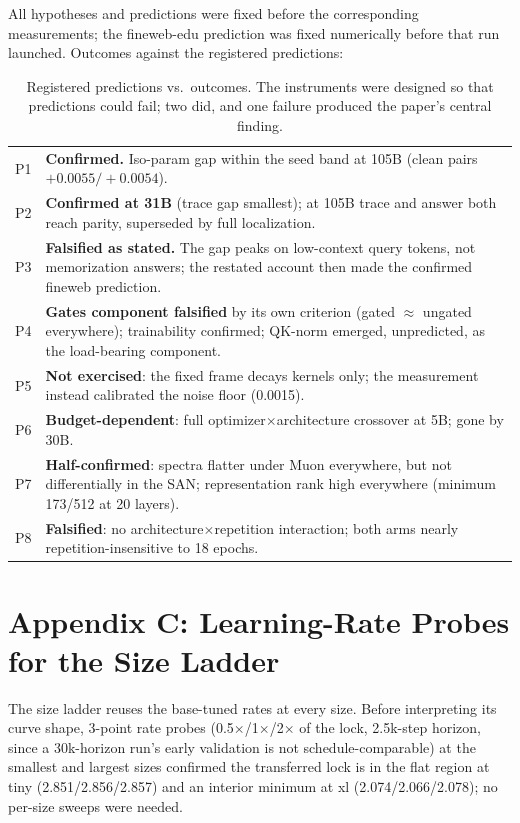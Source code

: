 \documentclass[letterpaper]{article} %
\begin{document}
All hypotheses and predictions were fixed before the corresponding
measurements; the fineweb-edu prediction was fixed numerically before
that run launched. Outcomes against the registered predictions:

\begin{table}[h]\centering\small
\begin{tabular}{p{}p{}}
\toprule
P1 & \textbf{Confirmed.} Iso-param gap within the seed band at 105B
(clean pairs $+0.0055/+0.0054$). \\
P2 & \textbf{Confirmed at 31B} (trace gap smallest); at 105B trace and
answer both reach parity, superseded by full localization. \\
P3 & \textbf{Falsified as stated.} The gap peaks on low-context query
tokens, not memorization answers; the restated account then made the
confirmed fineweb prediction. \\
P4 & \textbf{Gates component falsified} by its own criterion (gated
$\approx$ ungated everywhere); trainability confirmed; QK-norm emerged,
unpredicted, as the load-bearing component. \\
P5 & \textbf{Not exercised}: the fixed frame decays kernels only; the
measurement instead calibrated the noise floor (0.0015). \\
P6 & \textbf{Budget-dependent}: full optimizer$\times$architecture
crossover at 5B; gone by 30B. \\
P7 & \textbf{Half-confirmed}: spectra flatter under Muon everywhere, but
not differentially in the SAN; representation rank high everywhere
(minimum 173/512 at 20 layers). \\
P8 & \textbf{Falsified}: no architecture$\times$repetition interaction;
both arms nearly repetition-insensitive to 18 epochs. \\
\bottomrule
\end{tabular}
\caption{Registered predictions vs.\ outcomes. The instruments were
designed so that predictions could fail; two did, and one failure
produced the paper's central finding.}
\end{table}

\section{Appendix C: Learning-Rate Probes for the Size Ladder}

The size ladder reuses the base-tuned rates at every size. Before
interpreting its curve shape, 3-point rate probes
(0.5$\times$/1$\times$/2$\times$ of the lock, 2.5k-step horizon, since a
30k-horizon run's early validation is not schedule-comparable) at the
smallest and largest sizes confirmed the transferred lock is in the flat
region at tiny (2.851/2.856/2.857) and an interior minimum at xl
(2.074/2.066/2.078); no per-size sweeps were needed.
\end{document}
